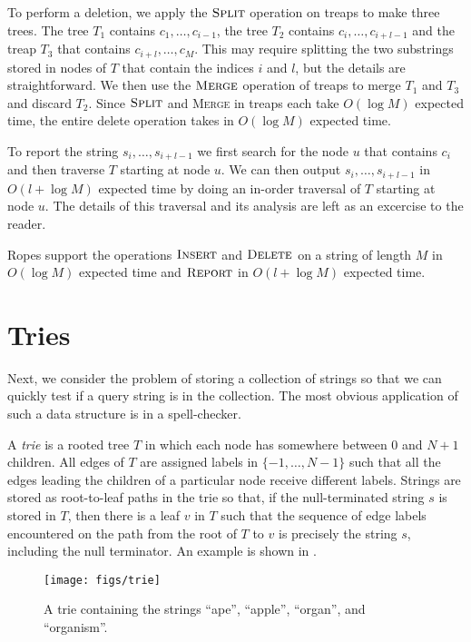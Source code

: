 To perform a deletion, we apply the $\textsc{Split}$ operation on treaps
to make three trees.  The tree $T_1$ contains $c_1,\ldots,c_{i-1}$,
the tree $T_2$ contains $c_{i},\ldots,c_{i+l-1}$ and the treap $T_3$
that contains $c_{i+l},\ldots,c_M$.  This may require splitting the two
substrings stored in nodes of $T$ that contain the indices $i$ and $l$,
but the details are straightforward.  We then use the $\textsc{Merge}$
operation of treaps to merge $T_1$ and $T_3$ and discard $T_2$. Since
$\textsc{Split}$ and \textsc{Merge} in treaps each take $O(\log M)$
expected time, the entire delete operation takes in $O(\log M)$
expected time.

To report the string $s_i,\ldots,s_{i+l-1}$ we first search for the
node $u$ that contains $c_i$ and then traverse $T$ starting at node
$u$.  We can then output $s_i,\ldots,s_{i+l-1}$ in $O(l+\log M)$
expected time by doing an in-order traversal of $T$ starting at node
$u$.  The details of this traversal and its analysis are left as an
excercise to the reader.

\begin{thm}
Ropes support the operations $\textsc{Insert}$ and $\textsc{Delete}$
on a string of length $M$ in $O(\log M)$ expected time and
$\textsc{Report}$ in $O(l+\log M)$ expected time.
\end{thm}

\section{Tries}

Next, we consider the problem of storing a collection of strings so
that we can quickly test if a query string is in the collection.  The
most obvious application of such a data structure is in a
spell-checker.

A \emph{trie} is a rooted tree $T$ in which each node has somewhere
between $0$ and $N+1$ children.  All edges of $T$ are assigned labels
in $\{-1,\ldots,N-1\}$ such that all the edges leading the children
of a particular node receive different labels.  Strings are stored as
root-to-leaf paths in the trie so that, if the null-terminated string
$s$ is stored in $T$, then there is a leaf $v$ in $T$ such that the
sequence of edge labels encountered on the path from the root of $T$
to $v$ is precisely the string $s$, including the null terminator.
An example is shown in .

\begin{figure}
  \begin{center}
    \texttt{[image: figs/trie]}
  \end{center}
  \caption{A trie containing the strings ``ape'', ``apple'', ``organ'', and ``organism''.}
\end{figure}


